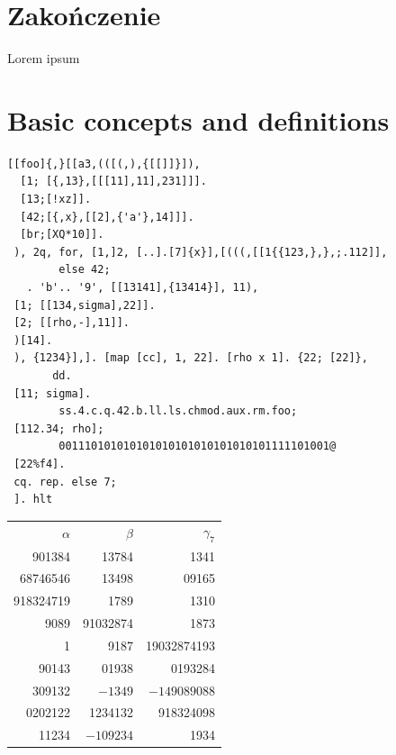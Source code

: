 \documentclass{pracamgr}
\begin{document}
 \chapter*{Zakończenie}\label{r:ending}
Lorem ipsum



\appendix

\chapter{Basic concepts and definitions}

\begin{verbatim}
[[foo]{,}[[a3,(([(,),{[[]]}]),
  [1; [{,13},[[[11],11],231]]].
  [13;[!xz]].
  [42;[{,x},[[2],{'a'},14]]].
  [br;[XQ*10]].
 ), 2q, for, [1,]2, [..].[7]{x}],[(((,[[1{{123,},},;.112]],
        else 42;
   . 'b'.. '9', [[13141],{13414}], 11),
 [1; [[134,sigma],22]].
 [2; [[rho,-],11]].
 )[14].
 ), {1234}],]. [map [cc], 1, 22]. [rho x 1]. {22; [22]},
       dd.
 [11; sigma].
        ss.4.c.q.42.b.ll.ls.chmod.aux.rm.foo;
 [112.34; rho];
        001110101010101010101010101010101111101001@
 [22%f4].
 cq. rep. else 7;
 ]. hlt
\end{verbatim}
 
 


\begin{center}
  \begin{tabular}{rrr}
    $\alpha$ & $\beta$ & $\gamma_7$ \\
    901384 & 13784 & 1341\\
    68746546 & 13498& 09165\\
    918324719& 1789 & 1310 \\
    9089 & 91032874& 1873 \\
    1 & 9187 & 19032874193 \\
    90143 & 01938 & 0193284 \\
    309132 & $-1349$ & $-149089088$ \\
    0202122 & 1234132 & 918324098 \\
    11234 & $-109234$ & 1934 \\
  \end{tabular}
\end{center}

\end{document}
